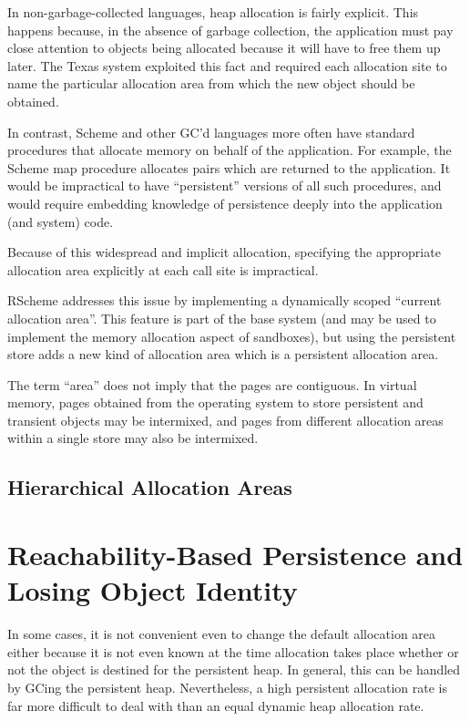 \documentclass[10pt,letterpaper]{article}
\begin{document}
In non-garbage-collected languages, heap allocation is fairly
explicit.  This happens because, in the absence of garbage collection,
the application must pay close attention to objects being allocated
because it will have to free them up later.  The Texas system exploited
this fact and required each allocation site to name the particular
allocation area from which the new object should be obtained.

In contrast, Scheme and other GC'd languages more often have standard
procedures that allocate memory on behalf of the application.  For
example, the Scheme map procedure allocates pairs which are returned
to the application.  It would be impractical to have ``persistent''
versions of all such procedures, and would require embedding knowledge
of persistence deeply into the application (and system) code.


Because of this widespread and implicit allocation, specifying the
appropriate allocation area explicitly at each call site is
impractical.

RScheme addresses this issue by implementing a dynamically scoped
``current allocation area''.  This feature is part of the base system
(and may be used to implement the memory allocation aspect of
sandboxes), but using the persistent store adds a new kind of allocation
area which is a persistent allocation area.

The term ``area'' does not imply that the pages are contiguous.
In virtual memory, pages obtained from the operating system to store
persistent and transient objects may be intermixed, and pages
from different allocation areas within a single store may
also be intermixed.

\subsection{Hierarchical Allocation Areas}


\section{Reachability-Based Persistence and Losing Object Identity}

In some cases, it is not convenient even to change the default allocation
area either because it is not even known at the time allocation takes
place whether or not the object is destined for the persistent heap.
In general, this can be handled by GCing the persistent heap.  Nevertheless,
a high persistent allocation rate is far more difficult to deal with
than an equal dynamic heap allocation rate.
\end{document}
